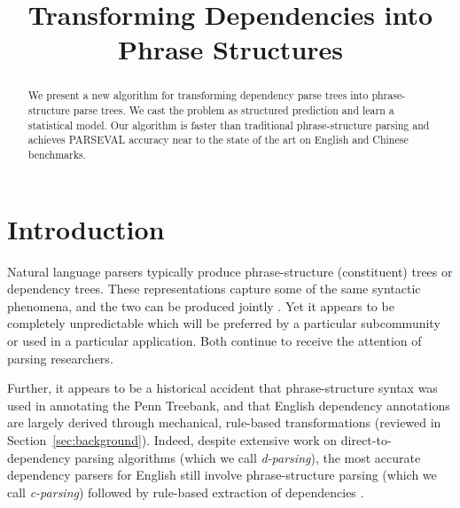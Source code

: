 \documentclass[11pt,letterpaper]{article}
\title{Transforming Dependencies into Phrase Structures}
\author{}
\date{}
\newcommand{\nascomment}[1]{\textcolor{blue}{\bf \small [#1 --nas]}}
\begin{document}
\maketitle
\begin{abstract}
We present a new algorithm for transforming dependency parse trees into
phrase-structure parse trees.  We cast the problem as  structured
prediction and learn a statistical model.  Our algorithm is faster than traditional
phrase-structure parsing and achieves PARSEVAL accuracy near to the state of
the art on English and Chinese benchmarks.




\end{abstract}

\section{Introduction}


Natural language parsers typically produce phrase-structure (constituent) trees or dependency trees.  These representations capture
some of the same syntactic phenomena, and the two can be produced
jointly \cite{carreras2008tag,rush2010dual}.  Yet it
appears to be completely unpredictable which will be preferred by a
particular subcommunity or used in a particular application.  Both continue to receive the attention of
parsing researchers.


Further, it appears to be a historical accident that phrase-structure
syntax was used in annotating the Penn Treebank, and that English
dependency annotations are largely derived through mechanical,
rule-based transformations (reviewed in Section~\ref{sec:background}).  Indeed,
despite extensive work on direct-to-dependency parsing algorithms
(which we call \emph{d-parsing}), the most accurate dependency
parsers for English still involve phrase-structure parsing (which we
call \emph{c-parsing}) followed by rule-based extraction of
dependencies \cite{kong2014empirical}.
\end{document}
